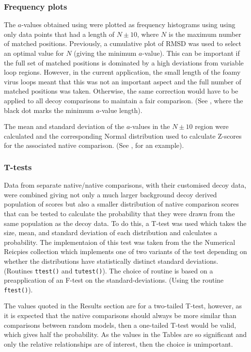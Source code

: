 \subsubsection{Frequency plots}

The $a$-values obtained using  were plotted as frequency histograms using using
only data points that had a length of $N\pm 10$, where $N$ is the maximum number of matched
positions.   Previously, a cumulative plot of RMSD was used to select an optimal value for
$N$ (giving the minimum $a$-value).   This can be important if the full set of matched
positions is dominated by a high deviations from variable loop regions.   However, in the
current application, the small length of the foamy virus loops meant that this was not
an important aspect and the full number of matched positions was taken.   Otherwise, the
same correction would have to be applied to all decoy comparisons to maintain a fair
comparison.  (See , where the black dot marks the minimum $a$-value length).

The mean and standard deviation of the $a$-values in the $N\pm10$ region were calculated
and the corresponding Normal distribution used to calculate Z-scores for the associated
native comparison. (See , for an example).

\subsubsection{T-tests}

Data from separate native/native comparisons, with their customised decoy data, were combined
giving not only a much larger background decoy derived population of scores but also a smaller
distribution of native comparison scores that can be tested to calculate the probability that
they were drawn from the same population as the decoy data.  To do this, a T-test was used which
takes the size, mean, and standard deviation of each distribution and calculates a probability.
The implementaion of this test was taken from the the Numerical Reicpies collection \cite{}
which implements one of two variants of the test depending on whether the distributions
have statistically distinct standard deviations. (Routines {\tt ttest()} and {\tt tutest()}).  
The choice of routine is based on a preapplication of an F-test on the standard-deviations. 
(Using the routine {\tt ftest()}).

The values quoted in the Results section are for a two-tailed T-test, however, as it is expected
that the native comparisons should always be more similar than comparisons between random models,
then a one-tailed T-test would be valid, which gives half the probability.   As the values
in the Tables are so significant and only the relative relationships are of interest,
then the choice is unimportant.

